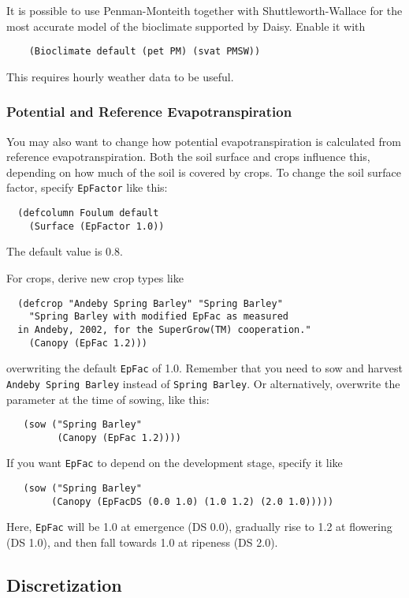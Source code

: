 \documentclass[a4paper]{article}
\begin{document}
It is possible to use Penman-Monteith together with
Shuttleworth-Wallace for the most accurate model of the bioclimate
supported by Daisy.  Enable it with
\begin{verbatim}
    (Bioclimate default (pet PM) (svat PMSW))
\end{verbatim}
This requires hourly weather data to be useful.  

\subsubsection{Potential and Reference Evapotranspiration}

You may also want to change how potential evapotranspiration is
calculated from reference evapotranspiration.  Both the soil surface
and crops influence this, depending on how much of the soil is covered
by crops.  To change the soil surface factor, specify
\texttt{EpFactor} like this:
\begin{verbatim}
  (defcolumn Foulum default
    (Surface (EpFactor 1.0))
\end{verbatim}
The default value is 0.8.

For crops, derive new crop types like
\begin{verbatim}
  (defcrop "Andeby Spring Barley" "Spring Barley"
    "Spring Barley with modified EpFac as measured
  in Andeby, 2002, for the SuperGrow(TM) cooperation."
    (Canopy (EpFac 1.2)))
\end{verbatim}
overwriting the default \texttt{EpFac} of 1.0.  Remember that you need
to sow and harvest \texttt{Andeby Spring Barley} instead of
\texttt{Spring Barley}.  Or alternatively, overwrite the parameter at
the time of sowing, like this:
\begin{verbatim}
   (sow ("Spring Barley"
         (Canopy (EpFac 1.2))))
\end{verbatim}
If you want \texttt{EpFac} to depend on the development stage, specify
it like
\begin{verbatim}
   (sow ("Spring Barley"
        (Canopy (EpFacDS (0.0 1.0) (1.0 1.2) (2.0 1.0)))))
\end{verbatim}
Here, \texttt{EpFac} will be 1.0 at emergence (DS 0.0), gradually rise
to 1.2 at flowering (DS 1.0), and then fall towards 1.0 at ripeness (DS
2.0).

\subsection{Discretization}
\end{document}
